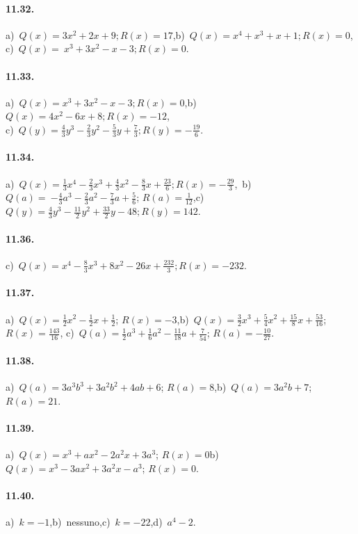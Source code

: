 \paragraph{11.32.}
a)~$Q(x)=3x^{2}+2x+9; R(x)=17$,\quad b)~$Q(x)=x^{4}+x^{3}+x+1; R(x)=0$, \protect\\ c)~$Q(x)=~x^{3}+3x^{2}-x-3; R(x)=0$.
\paragraph{11.33.}
a)~$Q(x)=x^{3}+3x^{2}-x-3; R(x)=0$,\quad b)~$Q(x)=4x^{2}-6x+8; R(x)=-12$,\protect\\ c)~$Q(y)=\frac{4}{3}y^{3}-\frac{2}{3}y^{2}-\frac{5}{3}y+\frac{7}{3}; R(y)=-\frac{19}{6}$.
\paragraph{11.34.}
a)~$Q(x)=\frac{1}{3}x^{4}-\frac{2}{3}x^{3}+\frac{4}{3}x^{2}-\frac{8}{3}x+\frac{23}{6}; R(x)=-\frac{29}{3}$,
\,b)~$Q(a)=~{-\frac{4}{3}a^{3}-\frac{2}{3}a^{2}-\frac{7}{3}a+\frac{5}{6}}$; $R(a)=\frac{1}{12}$,\quad c)~$Q(y)=\frac{4}{3}y^{3}-\frac{11}{2}y^{2}+\frac{33}{2}y-48; R(y)=142$.
\paragraph{11.36.}
c)~$Q(x)=x^{4}-\frac{8}{3}x^{3}+8x^{2}-26x+\frac{232}{3}; R(x)=-232$.
\paragraph{11.37.}
a)~$Q(x)=\frac{1}{2}x^{2}-\frac{1}{2}x+\frac{1}{2}$; $R(x)=-3$,\quad b)~$Q(x)=\frac{3}{2}x^{3}+\frac{5}{4}x^{2}+\frac{15}{8}x+\frac{53}{16}$; $R(x)=\frac{143}{16}$,
\quad c)~$Q(a)=\frac{1}{2}a^{3}+\frac{1}{6}a^{2}-\frac{11}{18}a+\frac{7}{54}$; $R(a)=-{\frac{10}{27}}$.
\paragraph{11.38.}
a)~$Q(a)=3a^{3}b^{3}+3a^{2}b^{2}+4ab+6$; $R(a)=8$,\quad b)~$Q(a)=3a^{2}b+7$; $R(a)=21$.
\paragraph{11.39.}
a)~$Q(x)=x^{3}+ax^{2}-2a^{2}x+3a^{3}$; $R(x)=0$\quad b)~$Q(x)=x^3-3ax^2+3a^2 x-a^3$; $R(x)=0$.
\paragraph{11.40.}
a)~$k=-1$,\quad b)~nessuno,\quad c)~$k=-22$,\quad d)~$a^{4}-2$.
